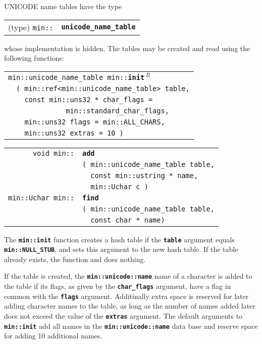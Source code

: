 \documentclass[12pt]{article}
\makeatletter
\newcommand{\TT}[1]{{\tt \bfseries #1}}
\newcommand{\ttindex}[1]{\index{#1@{\tt #1}}}
\newcommand{\EOL}{\penalty \exhyphenpenalty}
\newenvironment{indpar}[1][0.3in]%
	{\begin{list}{}%
		     {\setlength{\itemsep}{0in}%
		      \setlength{\topsep}{0in}%
		      \setlength{\parsep}{1ex}%
		      \setlength{\labelwidth}{#1}%
		      \setlength{\leftmargin}{#1}%
		      \addtolength{\leftmargin}{\labelsep}}%
	 \item}%
	{\end{list}}
\newcommand{\LABEL}[1]{\label{#1}}
\newlength{\ARGBREAKLENGTH}
\newcommand{\ARGBREAK}[1][\ARGBREAKLENGTH]{\\&\hspace*{#1}}
\newcommand{\MINKEY}[1]%
	   {\TT{#1}\ttindex{min::#1}\ttindex{#1}}
\newcommand{\REL}{$\,^R$}
\makeatother
\begin{document}
UNICODE name tables have the type

\begin{indpar}[1em]\begin{tabular}{r@{}l}
(type) \verb|min::| & \MINKEY{unicode\_name\_table}
\LABEL{MIN::UNICODE_NAME_TABLE} \\
\end{tabular}\end{indpar}

whose implementation is hidden.  The tables may be created and
read using the following functions:

\begin{indpar}\begin{tabular}{r@{}l}
\multicolumn{2}{l}{{\tt min::unicode\_name\_table
                        min::}\MINKEY{init\REL}}\ARGBREAK
    \verb|( min::ref<min::unicode_name_table> table,|\ARGBREAK
    \verb|  const min::uns32 * char_flags =|\ARGBREAK
    \verb|            min::standard_char_flags,|\ARGBREAK
    \verb|  min::uns32 flags = min::ALL_CHARS,|\ARGBREAK
    \verb|  min::uns32 extras = 10 )|
\LABEL{MIN::INIT_OF_UNICODE_NAME_TABLE} \\
\end{tabular}\end{indpar}

\begin{indpar}\begin{tabular}{r@{}l}
\verb|void min::| & \MINKEY{add}\ARGBREAK
    \verb|( min::unicode_name_table table,|\ARGBREAK
    \verb|  const min::ustring * name,|\ARGBREAK
    \verb|  min::Uchar c )|
\LABEL{MIN::ADD_OF_UNICODE_NAME_TABLE} \\
\verb|min::Uchar min::| & \MINKEY{find}\ARGBREAK
    \verb|( min::unicode_name_table table,|\ARGBREAK
    \verb|  const char * name)|
\LABEL{MIN::FIND_OF_UNICODE_NAME_TABLE} \\
\end{tabular}\end{indpar}

The \TT{min::init} function creates a hash table
if the \TT{table} argument equals \TT{min::\EOL NULL\_\EOL STUB},
and sets this argument to the new hash table.  If the table
already exists, the function and does nothing.  

If the table is created, the \TT{min::\EOL unicode::\EOL name}
name of a character is added to the table if its flags,
as given by the \TT{char\_\EOL flags} argument,
have a flag in common with the \TT{flags} argument.
Additinally extra space is reserved for later adding character
names to the table, as long as the number of names added later
does not exceed the value of the \TT{extras} argument.
The default arguments to \TT{min::\EOL init} add all names
in the \TT{min::\EOL unicode::\EOL name} data base and reserve
space for adding 10 additional names.
\end{document}
